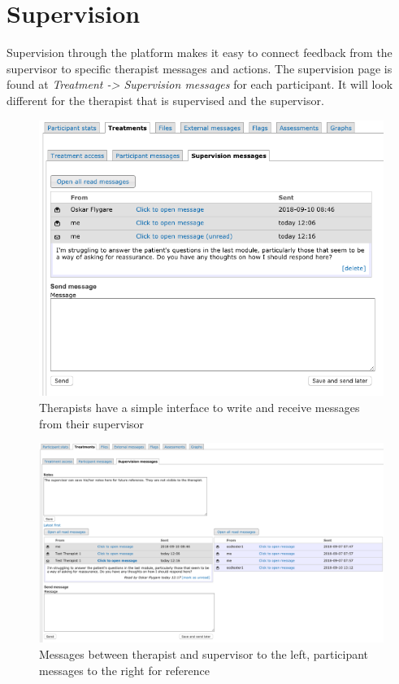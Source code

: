 \documentclass[]{book}
\theoremstyle{definition}
\theoremstyle{definition}
\theoremstyle{definition}
\theoremstyle{remark}
\begin{document}
\hypertarget{supervision}{%
\section{Supervision}\label{supervision}}

Supervision through the platform makes it easy to connect feedback from
the supervisor to specific therapist messages and actions. The
supervision page is found at \emph{Treatment -\textgreater{} Supervision
messages} for each participant. It will look different for the therapist
that is supervised and the supervisor.

\begin{figure}
\centering
\includegraphics{images/supervision-therapist.png}
\caption{Therapists have a simple interface to write and receive
messages from their supervisor}
\end{figure}

\begin{figure}
\centering
\includegraphics{images/supervisor-view.png}
\caption{Messages between therapist and supervisor to the left,
participant messages to the right for reference}
\end{figure}
\end{document}
